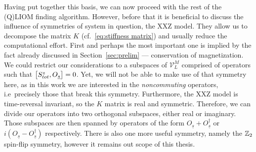 Having put together this basis, we can now proceed with the rest of the (Q)LIOM finding algorithm.
However, before that it is beneficial to discuss the influence of symmetries of system in question,
the XXZ model. They allow us to decompose the matrix \(K\) 
(cf.~\eqref{eq:stiffness matrix}) and usually reduce the computational effort. First and perhaps
the most important one is implied by the fact already discussed in Section~\ref{sec:prelim} ---
conservation of magnetization. We could restrict our considerations to a subspaces
of \(\mathcal{V}_L^M\) comprised of operators such that \(\comm{S_{tot}^z}{O_{\underline{s}}} = 0\).
Yet, we will not be able to make use of that symmetry here, as in this work we are interested 
in the \textit{noncommuting} operators, i.e\ precisely those that break this symmetry.
Furthermore, the XXZ model is time-reversal invariant, so the \(K\) matrix is real and symmetric.
Therefore, we can divide our operators into two orthogonal subspaces, either real or imaginary.
Those subspaces are then spanned by operators of the form 
\(O_{\underline{s}}+O^{\dagger}_{\underline{s}}\) or 
\(i(O_{\underline{s}}-O^{\dagger}_{\underline{s}})\) respectively. There is also one more
useful symmetry, namely the \(\mathbb{Z}_2\) spin-flip symmetry, however it remains out scope of
this thesis. 


